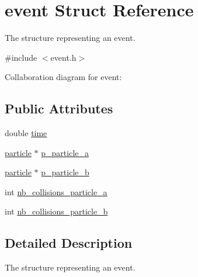 \hypertarget{structevent}{\section{event Struct Reference}
\label{structevent}
}


The structure representing an event.  




{\ttfamily \#include $<$event.\-h$>$}



Collaboration diagram for event\-:
\subsection*{Public Attributes}
\begin{DoxyCompactItemize}
\item 
double \hyperlink{structevent_a2f8d3ecdbdbc49add3f208a9cb16dc9b}{time}
\item 
\hyperlink{structparticle}{particle} $\ast$ \hyperlink{structevent_aed034813d6fc30a0ab3550f6bc6b576b}{p\-\_\-particle\-\_\-a}
\item 
\hyperlink{structparticle}{particle} $\ast$ \hyperlink{structevent_a09b317c63eff37aa95c28df226211a89}{p\-\_\-particle\-\_\-b}
\item 
int \hyperlink{structevent_ab480fea5e7249eff2c866c36e3530fb5}{nb\-\_\-collisions\-\_\-particle\-\_\-a}
\item 
int \hyperlink{structevent_a7a03ea309a524dfddfde47df334a0589}{nb\-\_\-collisions\-\_\-particle\-\_\-b}
\end{DoxyCompactItemize}


\subsection{Detailed Description}
The structure representing an event. 

